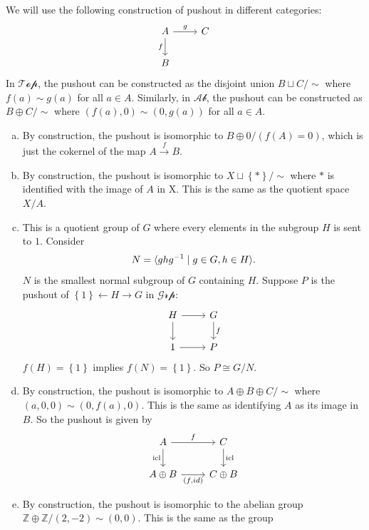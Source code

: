 \documentclass[a4paper, 12pt]{article}
\begin{document}
\begin{solution}
We will use the following construction of pushout in different categories:
\[\begin{tikzcd}
	A & C \\
	B
	\arrow["g", from=1-1, to=1-2]
	\arrow["f"', from=1-1, to=2-1]
\end{tikzcd}\]
In \(\mathcal{Top}\), the pushout can be constructed as the disjoint union \(B\sqcup C/\sim\) where \(f(a)\sim g(a)\) for all \(a\in A\). Similarly, in \(\mathcal{Ab}\), the pushout can be constructed as 
\(B\oplus C/\sim\) where \((f(a),0)\sim (0,g(a))\) for all \(a\in A\).
\begin{enumerate}[(a)]
\item By construction, the pushout is isomorphic to \(B\oplus 0/(f(A)=0)\), which is just the cokernel of the map \(A\xrightarrow{f} B\). 
\item By construction, the pushout is isomorphic to \(X\sqcup \left\{ * \right\}/\sim\) where \(*\) is identified with the image of \(A\) in X. This is the same as the quotient space \(X/A\). 
\item This is a quotient group of \(G\) where every elements in the subgroup \(H\) is sent to \(1\). Consider 
\[N=\langle ghg^{-1}\mid g\in G, h\in H\rangle.\]
\(N\) is the smallest normal subgroup of \(G\) containing \(H\). Suppose \(P\) is the pushout of \(\left\{ 1 \right\}\leftarrow H\rightarrow G\) in \(\mathcal{Grp}\):
\[\begin{tikzcd}
	H & G \\
	1 & P
	\arrow[from=1-1, to=1-2]
	\arrow[from=1-1, to=2-1]
	\arrow["f", from=1-2, to=2-2]
	\arrow[from=2-1, to=2-2]
\end{tikzcd}\]
\(f(H)=\left\{ 1 \right\}\) implies \(f(N)=\left\{ 1 \right\}\). So \(P\cong G/N\). 
\item By construction, the pushout is isomorphic to \(A\oplus B\oplus C/\sim \) where \((a,0,0)\sim (0,f(a),0)\). This is the same as identifying \(A\) as its image in \(B\). So the pushout is given by 
\[\begin{tikzcd}
	A & C \\
	{A\oplus B} & {C\oplus B}
	\arrow["f", from=1-1, to=1-2]
	\arrow["{\text{icl}}"', from=1-1, to=2-1]
	\arrow["{\text{icl}}", from=1-2, to=2-2]
	\arrow["{(f,id)}"', from=2-1, to=2-2]
\end{tikzcd}\]
\item By construction, the pushout is isomorphic to the abelian group \(\mathbb{Z}\oplus \mathbb{Z}/(2,-2)\sim(0,0)\). This is the same as the group 

\end{enumerate}
\end{solution}
\end{document}
